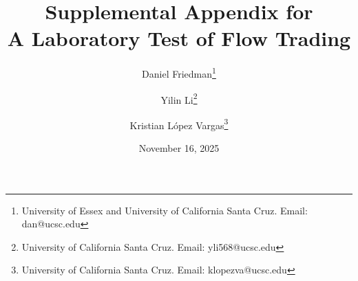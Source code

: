 \documentclass[12pt]{article}
\title{Supplemental Appendix for \\
A Laboratory Test of Flow Trading}
\author{
  Daniel Friedman\thanks{
  University of Essex and University of California Santa Cruz. Email: dan@ucsc.edu} 
\and
  Yilin Li\thanks{
  University of California Santa Cruz. Email: yli568@ucsc.edu} 
\and
  Kristian L\'opez Vargas\thanks{
  University of California Santa Cruz. Email: klopezva@ucsc.edu}}
\date{November 16, 2025}
\begin{document}
\maketitle

\begin{singlespace}
\appendix
\setcounter{page}{1}
    

%


% 

\end{singlespace}
\end{document}
